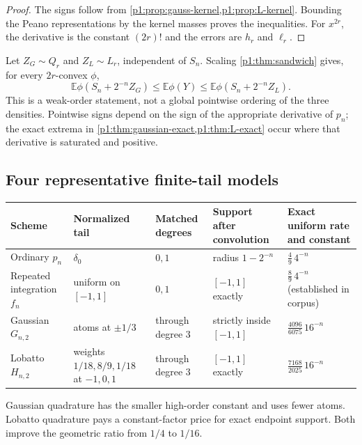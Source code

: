\documentclass[11pt]{article}
\numberwithin{equation}{section}
\theoremstyle{definition}
\theoremstyle{remark}
\newcommand{\E}{\mathbb E}
\begin{document}
\begin{proof}
The signs follow from \cref{p1:prop:gauss-kernel,p1:prop:L-kernel}.  Bounding the Peano representations by the kernel masses proves the inequalities.  For $x^{2r}$, the derivative is the constant $(2r)!$ and the errors are $h_r$ and $\ell_r$.
\end{proof}

Let $Z_G\sim Q_r$ and $Z_L\sim L_r$, independent of $S_n$.  Scaling \cref{p1:thm:sandwich} gives, for every $2r$-convex $\phi$,
\begin{equation}
 \boxed{
 \E\phi(S_n+2^{-n}Z_G)
 \le \E\phi(Y)
 \le \E\phi(S_n+2^{-n}Z_L).}
 \label{p1:eq:full-sandwich}
\end{equation}
This is a weak-order statement, not a global pointwise ordering of the three densities.  Pointwise signs depend on the sign of the appropriate derivative of $p_n$; the exact extrema in \cref{p1:thm:gaussian-exact,p1:thm:L-exact} occur where that derivative is saturated and positive.

\subsection{Four representative finite-tail models}

\begin{center}
\begin{tabularx}{0.98\textwidth}{@{}p{}p{}p{}p{}X@{}}
\toprule
Scheme & Normalized tail & Matched degrees & Support after convolution & Exact uniform rate and constant\\
\midrule
Ordinary $p_n$ & $\delta_0$ & $0,1$ & radius $1-2^{-n}$ & \(\frac49\,4^{-n}\)\\
Repeated integration $f_n$ & uniform on $[-1,1]$ & $0,1$ & $[-1,1]$ exactly & \(\frac89\,4^{-n}\) (established in corpus)\\
Gaussian $G_{n,2}$ & atoms at $\pm1/3$ & through degree $3$ & strictly inside $[-1,1]$ & \(\frac{4096}{6075}\,16^{-n}\)\\
Lobatto $H_{n,2}$ & weights $1/18,8/9,1/18$ at $-1,0,1$ & through degree $3$ & $[-1,1]$ exactly & \(\frac{7168}{2025}\,16^{-n}\)\\
\bottomrule
\end{tabularx}
\end{center}

Gaussian quadrature has the smaller high-order constant and uses fewer atoms.  Lobatto quadrature pays a constant-factor price for exact endpoint support.  Both improve the geometric ratio from $1/4$ to $1/16$.
\end{document}
